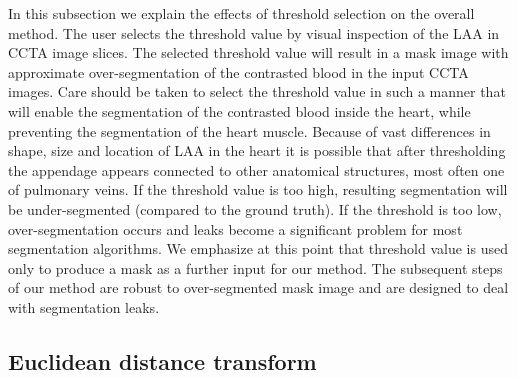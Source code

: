 \documentclass[review]{elsarticle}
\begin{document}
In this subsection we explain the effects of threshold selection on the overall
method. The user selects the threshold value by visual inspection of the LAA in
CCTA image slices. The selected threshold value will result in a mask image
with approximate over-segmentation of the contrasted blood in the input CCTA
images. Care should be taken to select the threshold value in such a manner
that will enable the segmentation of the contrasted blood inside the heart,
while preventing the segmentation of the heart muscle.  Because of vast
differences in shape, size and location of LAA in the heart it is possible that
after thresholding the appendage appears connected to other anatomical
structures, most often one of pulmonary veins.  If the threshold value is too
high, resulting segmentation will be under-segmented (compared to the ground
truth). If the threshold is too low, over-segmentation occurs and leaks become
a significant problem for most segmentation algorithms.  We emphasize at this
point that threshold value is used only to produce a mask as a further input
for our method. The subsequent steps of our method are robust to over-segmented
mask image and are designed to deal with segmentation leaks.



\subsection{Euclidean distance transform}
\label{sec:radiusimage}
\end{document}
